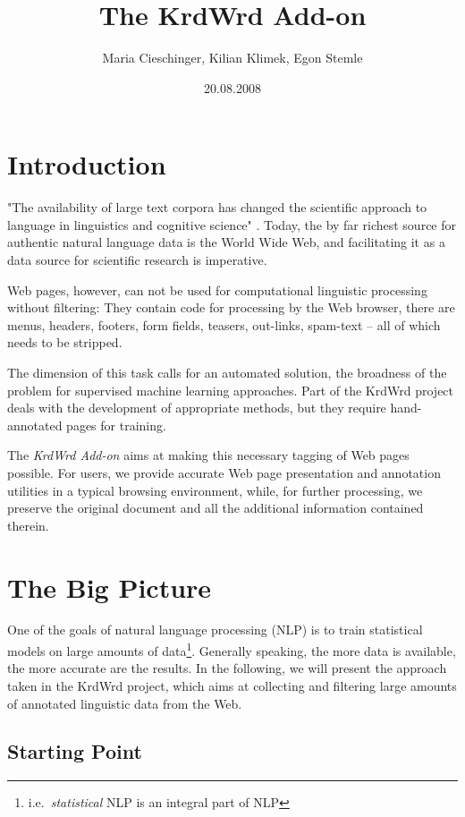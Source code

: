 \documentclass[12pt,a4paper]{article}
\title{The KrdWrd Add-on}
\author{Maria Cieschinger, Kilian Klimek, Egon Stemle}
\date{20.08.2008}
\begin{document}
\maketitle


\section{Introduction}

"The availability of large text corpora has changed the scientific approach to language in linguistics and cognitive science" \cite{ManningSchuetze1999}.
Today, the by far richest source for authentic natural language data is the World Wide Web, and facilitating it as a data source for scientific research is imperative.

Web pages, however, can not be used for computational linguistic processing without filtering:
They contain code for processing by the Web browser, there are menus, headers, footers, form fields, teasers, out-links, spam-text -- all of which needs to be stripped.

The dimension of this task calls for an automated solution, the broadness of the problem for supervised machine learning approaches.
Part of the KrdWrd \cite{krdwrd.org} project deals with the development of appropriate methods, but they require hand-annotated pages for training.

The \textit{KrdWrd Add-on} aims at making this necessary tagging of Web pages possible.
For users, we provide accurate Web page presentation and annotation utilities in a typical browsing environment, while, for further processing, we preserve the original document and all the additional information contained therein.


\section{The Big Picture}

One of the goals of natural language processing (NLP) is to train statistical models on large amounts of data\footnote{i.e.~\textit{statistical} NLP is an integral part of NLP}. Generally speaking, the more data is available, the more accurate are the results. In the following, we will present the approach taken in the KrdWrd project, which aims at collecting and filtering large amounts of annotated linguistic data from the Web.


\subsection{Starting Point}
\end{document}

